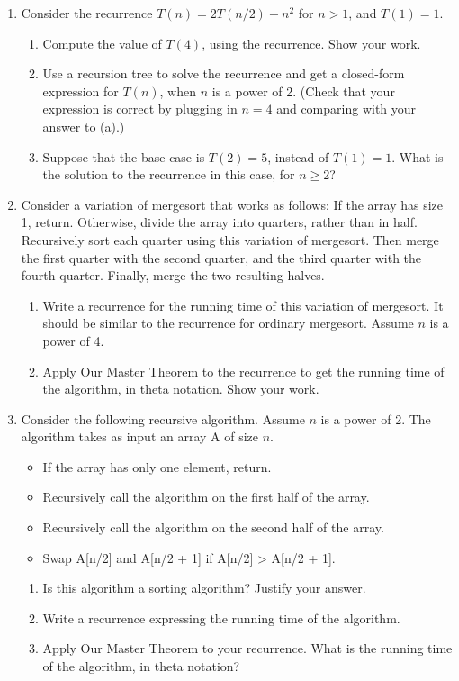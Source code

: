 \documentclass{article}
\begin{document}
\begin{enumerate}
    \item Consider the recurrence $T(n) = 2T(n/2) + n^2$ for $n > 1$, and $T(1) = 1$.
    \begin{enumerate}
        \item Compute the value of $T(4)$, using the recurrence. Show your work.
        \item Use a recursion tree to solve the recurrence and get a closed-form expression for $T(n)$, when $n$ is a power of 2. (Check that your expression is correct by plugging in $n = 4$ and comparing with your answer to (a).)
        \item Suppose that the base case is $T(2) = 5$, instead of $T(1) = 1$. What is the solution to the recurrence in this case, for $n \ge 2$?
    \end{enumerate}

    \item Consider a variation of mergesort that works as follows: If the array has size 1, return. Otherwise, divide the array into quarters, rather than in half. Recursively sort each quarter using this variation of mergesort. Then merge the first quarter with the second quarter, and the third quarter with the fourth quarter. Finally, merge the two resulting halves.
    \begin{enumerate}
        \item Write a recurrence for the running time of this variation of mergesort. It should be similar to the recurrence for ordinary mergesort. Assume $n$ is a power of 4.
        \item Apply Our Master Theorem to the recurrence to get the running time of the algorithm, in theta notation. Show your work.
    \end{enumerate}

    \item Consider the following recursive algorithm. Assume $n$ is a power of 2.  The algorithm takes as input an array A of size $n$.
    \begin{itemize}
        \item If the array has only one element, return.
        \item Recursively call the algorithm on the first half of the array.
        \item Recursively call the algorithm on the second half of the array.
        \item Swap A[n/2] and A[n/2 + 1] if A[n/2] > A[n/2 + 1].
    \end{itemize}
    \begin{enumerate}
        \item  Is this algorithm a sorting algorithm? Justify your answer.
        \item Write a recurrence expressing the running time of the algorithm.
        \item Apply Our Master Theorem to your recurrence. What is the running time of the algorithm, in theta notation?
    \end{enumerate}
\end{enumerate}
\end{document}
